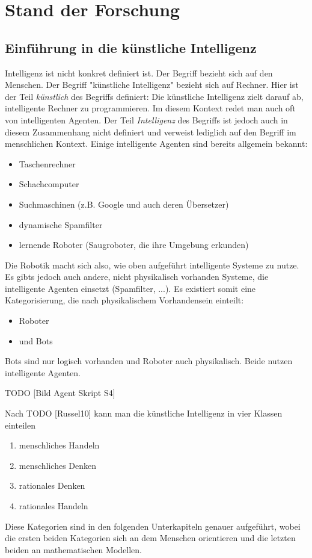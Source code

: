 \chapter{Stand der Forschung}
\section{Einführung in die künstliche Intelligenz}
Intelligenz ist nicht konkret definiert ist. Der Begriff bezieht sich auf den Menschen. Der Begriff "künstliche Intelligenz" bezieht sich auf Rechner. Hier ist der Teil \textit{künstlich} des Begriffs definiert: Die künstliche Intelligenz zielt darauf ab, intelligente Rechner zu programmieren. Im diesem Kontext redet man auch oft von intelligenten Agenten. Der Teil \textit{Intelligenz} des Begriffs ist jedoch auch in diesem Zusammenhang nicht definiert und verweist lediglich auf den Begriff im menschlichen Kontext.
Einige intelligente Agenten sind bereits allgemein bekannt:
\begin{itemize}
\item Taschenrechner
\item Schachcomputer
\item Suchmaschinen (z.B. Google und auch deren Übersetzer)
\item dynamische Spamfilter 
\item lernende Roboter (Saugroboter, die ihre Umgebung erkunden) 
\end{itemize}

Die Robotik macht sich also, wie oben aufgeführt intelligente Systeme zu nutze. Es gibts jedoch auch andere, nicht physikalisch vorhanden Systeme, die intelligente Agenten einsetzt (Spamfilter, ...). Es existiert somit eine Kategorisierung, die nach physikalischem Vorhandensein einteilt:
\begin{itemize}
\item Roboter
\item und Bots
\end{itemize} 
Bots sind nur logisch vorhanden und Roboter auch physikalisch. Beide nutzen intelligente Agenten. 

TODO [Bild Agent Skript S4]

Nach TODO [Russel10] kann man die künstliche Intelligenz in vier Klassen einteilen
\begin{enumerate}
\item menschliches Handeln
\item menschliches Denken
\item rationales Denken
\item rationales Handeln
\end{enumerate}
Diese Kategorien sind in den folgenden Unterkapiteln genauer aufgeführt, wobei die ersten beiden Kategorien sich an dem Menschen orientieren und die letzten beiden an mathematischen Modellen. 

